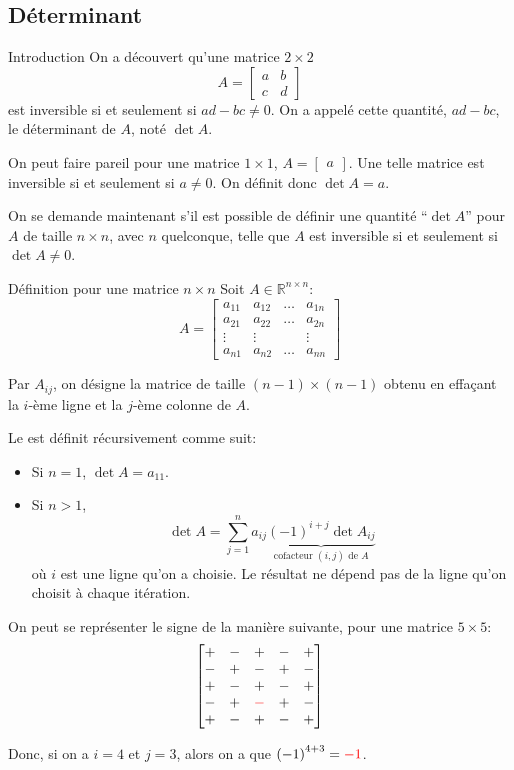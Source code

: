 \documentclass[a4paper]{article}
\begin{document}
\subsection{Déterminant}
\begin{parag}{Introduction}
    On a découvert qu'une matrice $2 \times 2$
    \[A = \begin{bmatrix} a & b \\ c & d \end{bmatrix} \]
    est inversible si et seulement si $ad - bc \neq 0$. On a appelé cette quantité, $ad - bc$, le déterminant de $A$, noté $\det A$.

    On peut faire pareil pour une matrice $1 \times 1$, $A = \begin{bmatrix} a \end{bmatrix} $. Une telle matrice est inversible si et seulement si $a \neq 0$. On définit donc $\det A = a$.

    On se demande maintenant s'il est possible de définir une quantité ``$\det A$'' pour $A$ de taille $n \times n$, avec $n$ quelconque, telle que $A$ est inversible si et seulement si $\det A \neq 0$.
\end{parag}

\begin{parag}{Définition pour une matrice $n \times n$}
    Soit $A \in \mathbb{R}^{n \times n}$:
    \[A = \begin{bmatrix} a_{11} & a_{12} & \ldots & a_{1n} \\ a_{21} & a_{22} & \ldots & a_{2n} \\ \vdots & \vdots &  & \vdots \\ a_{n1} & a_{n2} & \ldots & a_{nn} \end{bmatrix} \]

    Par $A_{ij}$, on désigne la matrice de taille $\left(n-1\right)\times \left(n -1\right)$ obtenu en effaçant la $i$-ème ligne et la $j$-ème colonne de $A$.

    Le  est définit récursivement comme suit:
    \begin{itemize}
        \item Si $n = 1$, $\det A = a_{11}$.
        \item Si $n > 1$,
            \[\det A = \sum_{j=1}^{n} a_{ij} \underbrace{\left(-1\right)^{i + j} \det A_{ij}}_{\text{cofacteur $\left(i, j\right)$ de $A$}} \]
            où $i$ est une ligne qu'on a choisie. Le résultat ne dépend pas de la ligne qu'on choisit à chaque itération.
    \end{itemize}

    On peut se représenter le signe de la manière suivante, pour une matrice $5\times5$:
    \[\begin{bmatrix} + & - & + & - & + \\ - & + & - & + & - \\ + & - & + & - & + \\ - & + & {\color{red}-} & + & - \\ + & - & + & - & + \end{bmatrix} \]

    Donc, si on a $i = 4$ et $j = 3$, alors on a que $\left(-1\right)^{4 + 3} = {\color{red}-1}$.
\end{parag}
\end{document}
